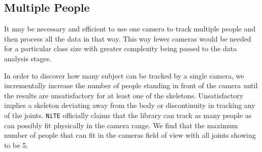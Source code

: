 \documentclass[11pt,a4paper]{article}
\begin{document}
\subsection{Multiple People}
\noindent
It may be necessary and efficient to use one camera to track multiple people and then process all the data in that way. This way fewer cameras would be needed for a particular class size with greater complexity being passed to the data analysis stages. 
 
\noindent
In order to discover how many subject can be tracked by a single camera, we incrementally increase the number of people standing in front of the camera until the results are unsatisfactory for at least one of the skeletons. Unsatisfactory implies a skeleton deviating away from the body or discontinuity in tracking any of the joints. \texttt{NiTE} officially claims that the library can track as many people as can possibly fit physically in the camera range. We find that the maximum number of people that can fit in the cameras field of view with all joints showing to be 5. 
 
\end{document}
